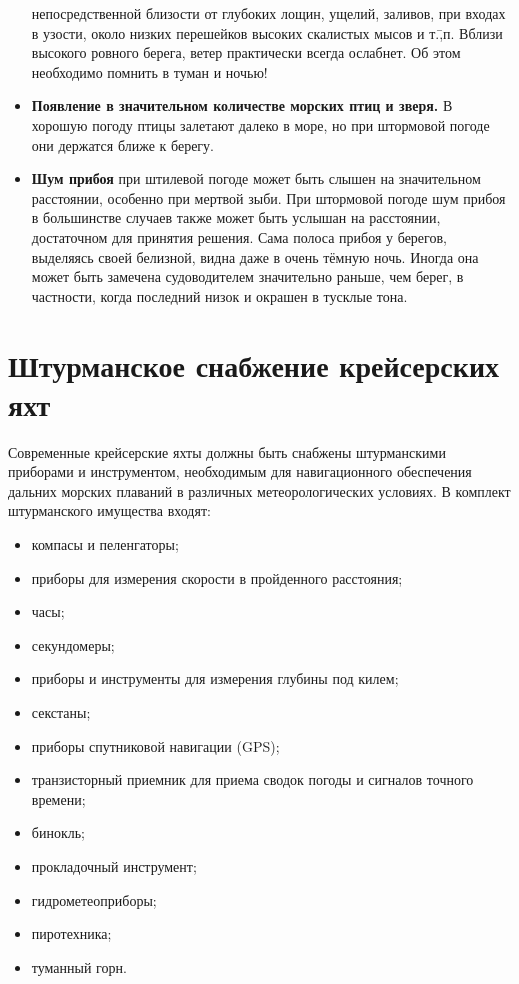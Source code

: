 \begin{itemize}
  непосредственной близости от глубоких лощин, ущелий, заливов, при
  входах в узости, около низких перешейков высоких скалистых мысов и
  т.\=,п. Вблизи высокого ровного берега, ветер практически всегда
  ослабнет. Об этом необходимо помнить в туман и ночью!
\item \textbf{Появление в значительном количестве морских птиц и
    зверя.} В хорошую погоду птицы залетают далеко в море, но при
  штормовой погоде они держатся ближе к берегу.
\item \textbf{Шум прибоя} при штилевой погоде может быть слышен на
  значительном расстоянии, особенно при мертвой зыби. При штормовой
  погоде шум прибоя в большинстве случаев также может быть услышан на
  расстоянии, достаточном для принятия решения. Сама полоса прибоя у
  берегов, выделяясь своей белизной, видна даже в очень тёмную
  ночь. Иногда она может быть замечена судоводителем значительно
  раньше, чем берег, в частности, когда последний низок и окрашен в
  тусклые тона.
\end{itemize}

\section{Штурманское снабжение крейсерских яхт}

Современные крейсерские яхты должны быть снабжены штурманскими
приборами и инструментом, необходимым для навигационного обеспечения
дальних морских плаваний в различных метеорологических условиях. В
комплект штурманского имущества входят:

\begin{itemize}
\item компасы и пеленгаторы; 
\item приборы для измерения скорости в пройденного расстояния; 
\item часы; 
\item секундомеры; 
\item приборы и инструменты для измерения глубины под килем; 
\item секстаны; 
\item приборы спутниковой навигации (GPS); 
\item транзисторный приемник для приема сводок погоды и сигналов точного времени; 
\item бинокль; 
\item прокладочный инструмент; 
\item гидрометеоприборы; 
\item пиротехника; 
\item туманный горн. 
\end{itemize}


